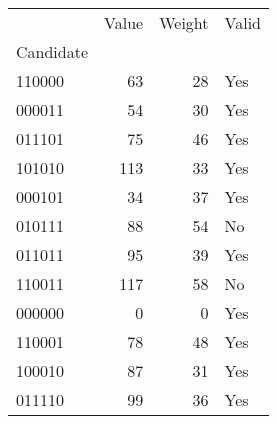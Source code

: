 \begin{tabular}{lrrl}
\hline
{} &                                    Value &                                   Weight &                                    Valid \\
Candidate                                &                                          &                                          &                                          \\
\midrule
110000                                   &                                       63 &                                       28 &                                      Yes \\
000011                                   &                                       54 &                                       30 &                                      Yes \\
011101                                   &                                       75 &                                       46 &                                      Yes \\
101010                                   &                                      113 &                                       33 &                                      Yes \\
000101                                   &                                       34 &                                       37 &                                      Yes \\
010111                                   &                                       88 &                                       54 &                                       No \\
011011                                   &                                       95 &                                       39 &                                      Yes \\
110011                                   &                                      117 &                                       58 &                                       No \\
000000                                   &                                        0 &                                        0 &                                      Yes \\
110001                                   &                                       78 &                                       48 &                                      Yes \\
100010                                   &                                       87 &                                       31 &                                      Yes \\
011110                                   &                                       99 &                                       36 &                                      Yes \\
\hline
\end{tabular}
